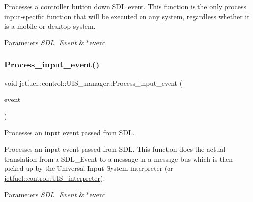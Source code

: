Processes a controller button down S\+DL event. This function is the only process input-\/specific function that will be executed on any system, regardless whether it is a mobile or desktop system.


\begin{DoxyParams}{Parameters}
{\em S\+D\+L\+\_\+\+Event} & $\ast$event \\
\hline
\end{DoxyParams}
\mbox{\label{classjetfuel_1_1control_1_1UIS__manager_a389d615922d1d3f408e46ae05c37d125}} 
\subsubsection{\texorpdfstring{Process\+\_\+input\+\_\+event()}{Process\_input\_event()}}
{\footnotesize\ttfamily void jetfuel\+::control\+::\+U\+I\+S\+\_\+manager\+::\+Process\+\_\+input\+\_\+event (\begin{DoxyParamCaption}\item[{S\+D\+L\+\_\+\+Event $\ast$}]{event }\end{DoxyParamCaption})}



Processes an input event passed from S\+DL. 

Processes an input event passed from S\+DL. This function does the actual translation from a S\+D\+L\+\_\+\+Event to a message in a message bus which is then picked up by the Universal Input System interpreter (or \hyperlink{classjetfuel_1_1control_1_1UIS__interpreter}{jetfuel\+::control\+::\+U\+I\+S\+\_\+interpreter}).


\begin{DoxyParams}{Parameters}
{\em S\+D\+L\+\_\+\+Event} & $\ast$event \\
\hline
\end{DoxyParams}
\mbox{\label{classjetfuel_1_1control_1_1UIS__manager_a93f728a261ed7f901aad2f5707b46ca8}} 
